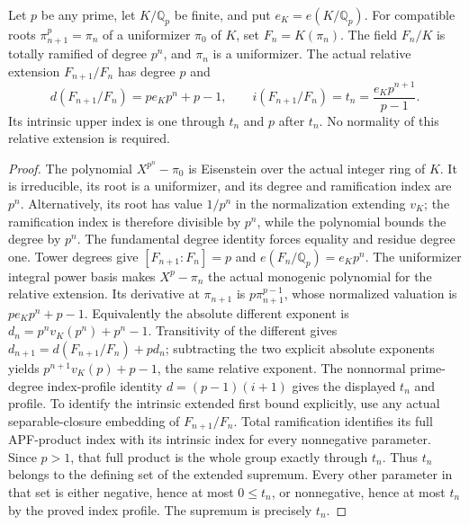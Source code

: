 \begin{lemma}
\label{ft:direct-radical-step}
\leanok
Let $p$ be any prime, let $K/\mathbb Q_p$ be finite, and put
$e_K=e(K/\mathbb Q_p)$. For compatible roots
$\pi_{n+1}^p=\pi_n$ of a uniformizer $\pi_0$ of $K$, set
$F_n=K(\pi_n)$. The field $F_n/K$ is totally ramified of degree
$p^n$, and $\pi_n$ is a uniformizer. The actual relative extension
$F_{n+1}/F_n$ has degree $p$ and
\[
 d(F_{n+1}/F_n)=p e_Kp^n+p-1,\qquad
 i(F_{n+1}/F_n)=t_n=\frac{e_Kp^{n+1}}{p-1}.
\]
Its intrinsic upper index is one through $t_n$ and $p$ after $t_n$.
No normality of this relative extension is required.
\end{lemma}
\begin{proof}
The polynomial $X^{p^n}-\pi_0$ is Eisenstein over the actual
integer ring of $K$. It is irreducible, its root is a uniformizer,
and its degree and ramification index are $p^n$. Alternatively,
its root has value $1/p^n$ in the normalization extending $v_K$;
the ramification index is therefore divisible by $p^n$, while
the polynomial bounds the degree by $p^n$. The fundamental degree
identity forces equality and residue degree one. Tower degrees
give $[F_{n+1}:F_n]=p$ and $e(F_n/\mathbb Q_p)=e_Kp^n$.
The uniformizer integral power basis makes $X^p-\pi_n$ the actual
monogenic polynomial for the relative extension. Its derivative
at $\pi_{n+1}$ is $p\pi_{n+1}^{p-1}$, whose normalized valuation
is $p e_Kp^n+p-1$. Equivalently the absolute different exponent is
$d_n=p^n v_K(p^n)+p^n-1$. Transitivity of the different gives
$d_{n+1}=d(F_{n+1}/F_n)+p d_n$; subtracting the two explicit
absolute exponents yields $p^{n+1}v_K(p)+p-1$, the same relative
exponent. The nonnormal prime-degree index-profile
identity $d=(p-1)(i+1)$ gives the displayed $t_n$ and profile.
To identify the intrinsic extended first bound explicitly, use any
actual separable-closure embedding of $F_{n+1}/F_n$.
Total ramification identifies its full APF-product index with its
intrinsic index for every nonnegative parameter. Since $p>1$,
that full product is the whole group exactly through $t_n$.
Thus $t_n$ belongs to the defining set of the extended supremum.
Every other parameter in that set is either negative, hence at
most $0\leq t_n$, or nonnegative, hence at most $t_n$ by the
proved index profile. The supremum is precisely $t_n$.
\end{proof}

